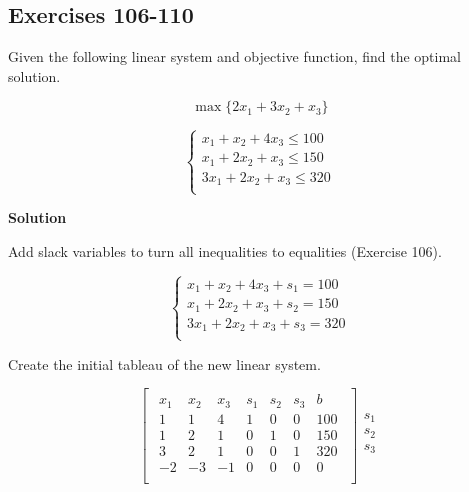 \documentclass{article}
\begin{document}
\newpage

\subsection*{Exercises 106-110}

Given the following linear system and objective function, find the optimal solution.

\begin{equation*}
\max \{ 2x_1 + 3x_2 + x_3 \}
\end{equation*}

\[
\left\{
\begin{array}{l}
x_1 + x_2 + 4x_3 \leq 100 \\
x_1 + 2x_2 + x_3 \leq 150 \\
3x_1 + 2x_2 + x_3 \leq 320 \\
\end{array}
\right.
\]

\textbf{Solution}

Add slack variables to turn all inequalities to equalities (Exercise 106).

\[
\left\{
\begin{array}{l}
x_1 + x_2 + 4x_3 + s_1 = 100 \\
x_1 + 2x_2 + x_3 + s_2 = 150 \\
3x_1 + 2x_2 + x_3 + s_3 = 320 \\
\end{array}
\right.
\]

Create the initial tableau of the new linear system.

\[
\begin{bmatrix}
\begin{array}{cccccc|c}
x_1 & x_2 & x_3 & s_1 & s_2 & s_3 & b \\
\hline
1 & 1 & 4 & 1 & 0 & 0 & 100 \\
1 & 2 & 1 & 0 & 1 & 0 & 150 \\
3 & 2 & 1 & 0 & 0 & 1 & 320 \\
\hline
-2 & -3 & -1 & 0 & 0 & 0 & 0 \\
\end{array}
\end{bmatrix}
\begin{array}{c}
\\
s_1 \\
s_2 \\
s_3 \\
\\
\end{array}
\]
\end{document}
